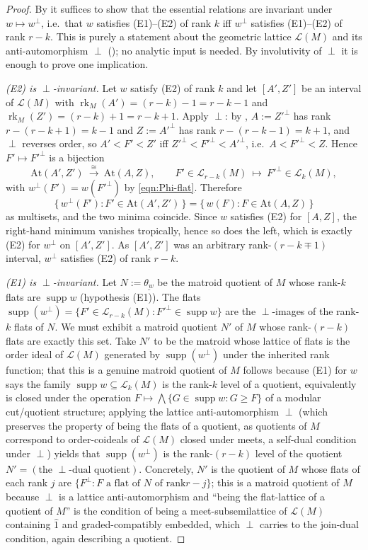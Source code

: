 \documentclass{article}
\theoremstyle{definition}
\newcommand{\rk}{\operatorname{rk}}
\newcommand{\cLL}{\mathcal{L}}
\begin{document}
\begin{proof}
By  it suffices to show that the essential relations are invariant
under $w\mapsto w^{\perp}$, i.e.\ that $w$ satisfies (E1)--(E2) of rank $k$ iff $w^{\perp}$ satisfies
(E1)--(E2) of rank $r-k$. This is purely a statement about the geometric lattice $\cLL(M)$ and its
anti-automorphism $\perp$ (); no analytic input is needed. By involutivity of $\perp$
it is enough to prove one implication.

\emph{(E2) is $\perp$-invariant.} Let $w$ satisfy (E2) of rank $k$ and let $[A',Z']$ be an interval
of $\cLL(M)$ with $\rk_M(A')=(r-k)-1=r-k-1$ and $\rk_M(Z')=(r-k)+1=r-k+1$. Apply $\perp$: by
, $A:=Z'^{\perp}$ has rank $r-(r-k+1)=k-1$ and $Z:=A'^{\perp}$ has rank
$r-(r-k-1)=k+1$, and $\perp$ reverses order, so $A'<F'<Z'$ iff $Z'^{\perp}<F'^{\perp}<A'^{\perp}$,
i.e.\ $A<F'^{\perp}<Z$. Hence $F'\mapsto F'^{\perp}$ is a bijection
\[
  \mathrm{At}(A',Z')\ \xrightarrow{\ \cong\ }\ \mathrm{At}(A,Z),\qquad
  F'\in\cLL_{r-k}(M)\ \mapsto\ F'^{\perp}\in\cLL_k(M),
\]
with $w^{\perp}(F')=w(F'^{\perp})$ by \eqref{eqn:Phi-flat}. Therefore
\[
  \{\,w^{\perp}(F'):F'\in\mathrm{At}(A',Z')\,\}=\{\,w(F):F\in\mathrm{At}(A,Z)\,\}
\]
as multisets, and the two minima coincide. Since $w$ satisfies (E2) for $[A,Z]$, the right-hand
minimum vanishes tropically, hence so does the left, which is exactly (E2) for $w^{\perp}$ on
$[A',Z']$. As $[A',Z']$ was an arbitrary rank-$(r-k\mp1)$ interval, $w^{\perp}$ satisfies (E2) of
rank $r-k$.

\emph{(E1) is $\perp$-invariant.} Let $N:=\underline{\theta_w}$ be the matroid quotient of $M$ whose
rank-$k$ flats are $\operatorname{supp}w$ (hypothesis (E1)). The flats $\operatorname{supp}(w^{\perp})
=\{F'\in\cLL_{r-k}(M):F'^{\perp}\in\operatorname{supp}w\}$ are the $\perp$-images of the rank-$k$
flats of $N$. We must exhibit a matroid quotient $N'$ of $M$ whose rank-$(r-k)$ flats are exactly
this set. Take $N'$ to be the matroid whose lattice of flats is the order ideal of $\cLL(M)$
generated by $\operatorname{supp}(w^{\perp})$ under the inherited rank function; that this is a
genuine matroid quotient of $M$ follows because (E1) for $w$ says the family
$\operatorname{supp}w\subseteq\cLL_k(M)$ is the rank-$k$ level of a quotient, equivalently is closed
under the operation $F\mapsto\bigwedge\{G\in\operatorname{supp}w:G\ge F\}$ of a modular cut/quotient
structure; applying the lattice anti-automorphism $\perp$ (which preserves the property of being the
flats of a quotient, as quotients of $M$ correspond to order-coideals of $\cLL(M)$ closed under
meets, a self-dual condition under $\perp$) yields that $\operatorname{supp}(w^{\perp})$ is the
rank-$(r-k)$ level of the quotient $N'=(\text{the }\perp\text{-dual quotient})$. Concretely, $N'$ is
the quotient of $M$ whose flats of each rank $j$ are $\{F^{\perp}:F\text{ a flat of }N\text{ of rank
}r-j\}$; this is a matroid quotient of $M$ because $\perp$ is a lattice anti-automorphism and
``being the flat-lattice of a quotient of $M$'' is the condition of being a meet-subsemilattice of
$\cLL(M)$ containing $\hat1$ and graded-compatibly embedded, which $\perp$ carries to the join-dual
condition, again describing a quotient.


\end{proof}
\end{document}
